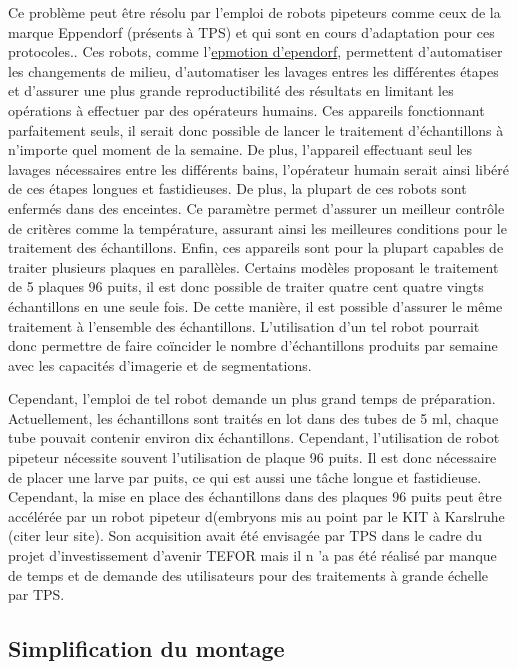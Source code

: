 \documentclass[\main/main.tex]{subfiles}
\begin{document}
%
Ce problème peut être résolu par l'emploi de robots pipeteurs comme ceux de la marque Eppendorf (présents à TPS) et qui sont en cours d'adaptation pour ces protocoles..
%
Ces robots,
comme l'\href{https://online-shop.eppendorf.fr/FR-fr/Automates-de-pipetage-44509.html#goto-Automates-de-pipetage-WebPMain-44509}{epmotion d'ependorf},
permettent d'automatiser les changements de milieu, d'automatiser les lavages entres les différentes étapes
et d'assurer une plus grande reproductibilité des résultats en limitant les opérations à effectuer par des opérateurs humains.
%
Ces appareils fonctionnant parfaitement seuls, il serait donc possible de lancer le traitement d'échantillons à n'importe quel moment de la semaine.
%
De plus, l'appareil effectuant seul les lavages nécessaires entre les différents bains,
l'opérateur humain serait ainsi libéré de ces étapes longues et fastidieuses.
%
De plus, la plupart de ces robots sont enfermés dans des enceintes.
%
Ce paramètre permet d'assurer un meilleur contrôle de critères comme la température,
assurant ainsi les meilleures conditions pour le traitement des échantillons.
%
Enfin, ces appareils sont pour la plupart capables de traiter plusieurs plaques en parallèles.
%
Certains modèles proposant le traitement de 5 plaques 96 puits, il est donc possible de traiter quatre cent quatre vingts échantillons en une seule fois.
%
De cette manière, il est possible d'assurer le même traitement à l'ensemble des échantillons.
%
L'utilisation d'un tel robot pourrait donc permettre de faire coïncider le nombre d'échantillons produits par semaine avec les capacités d'imagerie et de segmentations.

%
Cependant, l'emploi de tel robot demande un plus grand temps de préparation.
%
Actuellement, les échantillons sont traités en lot dans des tubes de 5 ml,
chaque tube pouvait contenir environ dix échantillons.
%
Cependant, l'utilisation de robot pipeteur nécessite souvent l'utilisation de plaque 96 puits.
%
Il est donc nécessaire de placer une larve par puits,
ce qui est aussi une tâche longue et fastidieuse.
%
Cependant, la mise en place des échantillons dans des plaques 96 puits peut être accélérée par un robot pipeteur d(embryons mis au point par le KIT à Karslruhe (citer leur site). Son acquisition avait été envisagée par TPS dans le cadre du projet d'investissement d'avenir TEFOR mais il n 'a pas été réalisé par manque de temps et de demande des utilisateurs pour des traitements à grande échelle par TPS.

    \subsection{Simplification du montage}
\end{document}
